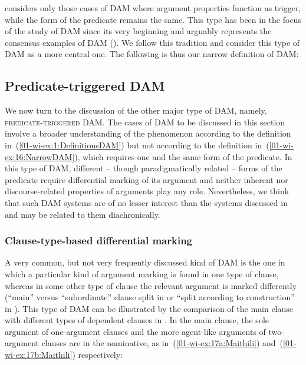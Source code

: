 \documentclass[output=paper]{LSP/langsci}
\begin{document}
 considers only those cases of DAM where argument properties function as trigger, while the form of the predicate remains the same. 
This type has been in the focus of the study of DAM since its very beginning and arguably represents the consensus examples of DAM (\cf \citealt{Bossong1985Differentielle, Bossong1991Differential}). 
We follow this tradition and consider this type of DAM as a more central one. The following is thus our narrow definition of DAM:


\subsection{Predicate-triggered DAM}
\label{01-wi-sec:2.2-Predicate-triggered}
We now turn to the discussion of the other major type of DAM, namely, \textsc{predicate-triggered} DAM. 
The cases of DAM to be discussed in this section involve a broader understanding of the phenomenon according to the definition in~(\ref{01-wi-ex:1:DefinitionsDAM}) but not according to the definition in~(\ref{01-wi-ex:16:NarrowDAM}), which requires one and the same form of the predicate. 
In this type of DAM, different – though paradigmatically related – forms of the predicate require differential marking of its argument and neither inherent nor discourse-related properties of arguments play any role. 
Nevertheless, we think that such DAM systems are of no lesser interest than the systems discussed in~ and may be related to them diachronically. 

\subsubsection{Clause-type-based differential marking}
\label{01-wi-sec:2.2.1-Clause-type-based}

A very common, but not very frequently discussed kind of DAM is the one in which a particular kind of argument marking is found in one type of clause, whereas in some other type of clause the relevant argument is marked differently (\cf “main” versus “subordinate” clause split in \citealt[101]{Dixon1994Ergativity} or “split according to construction” in \citealt[492]{McGregor2009Typology}). 
This type of DAM can be illustrated by the comparison of the main clause with different types of dependent clauses in . 
In the main clause, the sole argument of one-argument clauses and the more agent-like arguments of two-argument clauses are in the nominative, as in~(\ref{01-wi-ex:17a:Maithili}) and~(\ref{01-wi-ex:17b:Maithili}) respectively:
\end{document}
